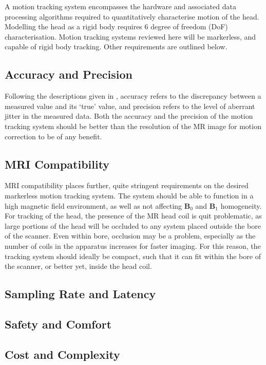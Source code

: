 \documentclass[class=article, crop=false]{standalone}
\begin{document}
A motion tracking system encompasses the hardware and associated data processing algorithms required to quantitatively characterise motion of the head. Modelling the head as a rigid body requires 6 degree of freedom (DoF) characterisation. Motion tracking systems reviewed here will be markerless, and capable of rigid body tracking. Other requirements are outlined below.

\subsection{Accuracy and Precision}
Following the descriptions given in \parencite{Maclaren2013}, accuracy refers to the discrepancy between a measured value and its `true' value, and precision refers to the level of aberrant jitter in the measured data. Both the accuracy and the precision of the motion tracking system should be better than the resolution of the MR image for motion correction to be of any benefit.

\subsection{MRI Compatibility}
MRI compatibility places further, quite stringent requirements on the desired markerless motion tracking system. The system should be able to function in a high magnetic field environment, as well as not affecting $\textbf{B}_0$ and $\textbf{B}_1$ homogeneity. For tracking of the head, the presence of the MR head coil is quit problematic, as large portions of the head will be occluded to any system placed outside the bore of the scanner. Even within bore, occlusion may be a problem, especially as the number of coils in the apparatus increases for faster imaging. For this reason, the tracking system should ideally be compact, such that it can fit within the bore of the scanner, or better yet, inside the head coil.

\subsection{Sampling Rate and Latency}

\subsection{Safety and Comfort}

\subsection{Cost and Complexity}
\end{document}

